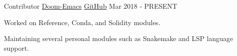 

\begin{cventries}


	\cventry
	{Contributor} %
	{\href{https://github.com/hlissner/doom-emacs}{Doom-Emacs}} %
	{\href{https://github.com/hlissner/doom-emacs}{GitHub}} %
	{Mar 2018 - PRESENT} %
	{
		\begin{cvitems} %
			\item {Worked on Reference, Conda, and Solidity modules.}
			\item {Maintaining several personal modules such as Snakemake and LSP language support.}
		\end{cvitems}
	}



\end{cventries}
